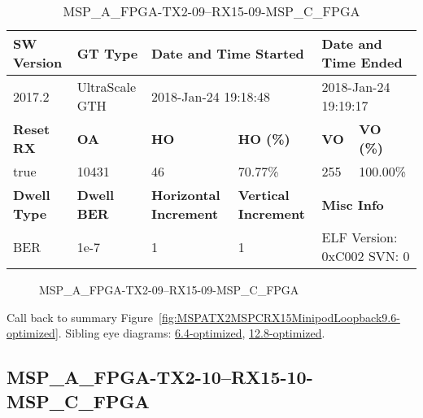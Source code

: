 \begin{table}[h]
\centering
\caption{MSP\_A\_FPGA-TX2-09--RX15-09-MSP\_C\_FPGA}
\label{tab:MSPAFPGATX209RX1509MSPCFPGA9.6-optimized}
\begin{tabular}{@{}|l|l|l|l|l|l|@{}}
\toprule
\textbf{SW Version}                & \textbf{GT Type}   & \multicolumn{2}{l|}{\textbf{Date and Time Started}}            & \multicolumn{2}{l|}{\textbf{Date and Time Ended}}        \\ \midrule
2017.2                       & UltraScale GTH          & \multicolumn{2}{l|}{2018-Jan-24 19:18:48}                   & \multicolumn{2}{l|}{2018-Jan-24 19:19:17}               \\ \midrule
\textbf{Reset RX}                  & \textbf{OA} & \textbf{HO}   & \textbf{HO (\%)} & \textbf{VO} & \textbf{VO (\%)} \\ \midrule
true & 10431        & 46          & 70.77\%        & 255        & 100.00\%       \\ \midrule
\textbf{Dwell Type}                & \textbf{Dwell BER} & \textbf{Horizontal Increment} & \textbf{Vertical Increment}    & \multicolumn{2}{l|}{\textbf{Misc Info}}                  \\ \midrule
BER                            & 1e-7        & 1        & 1           & \multicolumn{2}{l|}{ELF Version: 0xC002 SVN: 0}                         \\ \bottomrule
\end{tabular}
\end{table}

\begin{figure}[h]
\caption{MSP\_A\_FPGA-TX2-09--RX15-09-MSP\_C\_FPGA} \label{fig:MSPAFPGATX209RX1509MSPCFPGA9.6-optimized}
\end{figure}

Call back to summary Figure~\ref{fig:MSPATX2MSPCRX15MinipodLoopback9.6-optimized}.
Sibling eye diagrams: \hyperref[sec:MSPAFPGATX209RX1509MSPCFPGA6.4-optimized]{6.4-optimized}, \hyperref[sec:MSPAFPGATX209RX1509MSPCFPGA12.8-optimized]{12.8-optimized}.

\clearpage
\newpage


\subsection{MSP\_A\_FPGA-TX2-10--RX15-10-MSP\_C\_FPGA}\label{sec:MSPAFPGATX210RX1510MSPCFPGA9.6-optimized}

